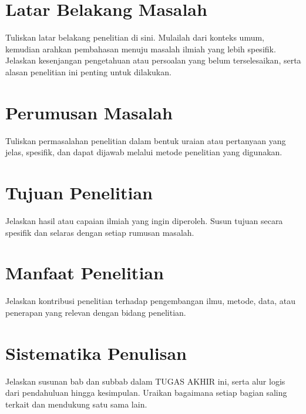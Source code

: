 \documentclass[skripsi]{ugmskripsi}
\begin{document}
\section{Latar Belakang Masalah}
Tuliskan latar belakang penelitian di sini. Mulailah dari konteks umum,
kemudian arahkan pembahasan menuju masalah ilmiah yang lebih spesifik.
Jelaskan kesenjangan pengetahuan atau persoalan yang belum terselesaikan,
serta alasan penelitian ini penting untuk dilakukan.

\section{Perumusan Masalah}
Tuliskan permasalahan penelitian dalam bentuk uraian atau pertanyaan yang
jelas, spesifik, dan dapat dijawab melalui metode penelitian yang digunakan.

\section{Tujuan Penelitian}
Jelaskan hasil atau capaian ilmiah yang ingin diperoleh. Susun tujuan secara
spesifik dan selaras dengan setiap rumusan masalah.

\section{Manfaat Penelitian}
Jelaskan kontribusi penelitian terhadap pengembangan ilmu, metode, data,
atau penerapan yang relevan dengan bidang penelitian.

\section{Sistematika Penulisan}
Jelaskan susunan bab dan subbab dalam TUGAS AKHIR ini, serta alur logis dari pendahuluan hingga kesimpulan.
Uraikan bagaimana setiap bagian saling terkait dan mendukung satu sama lain.

\end{document}
